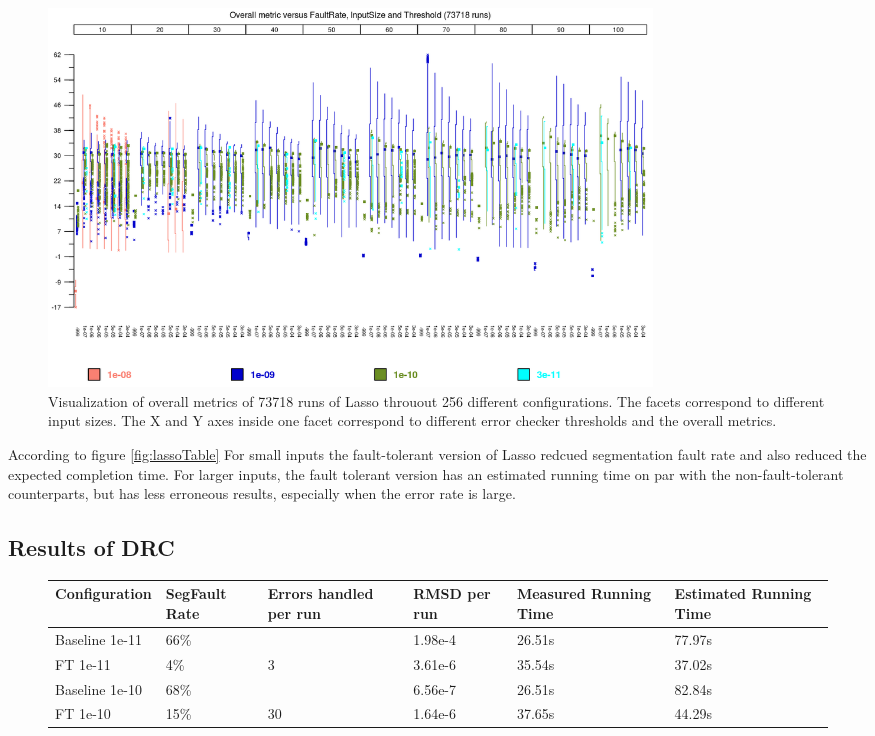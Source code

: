 \documentclass{article}
\begin{document}
\begin{figure}[h!]
\begin{center}
\includegraphics[width=16cm]{OverallMetric_Lasso_Boxplot.png}
\end{center}
\caption{Visualization of overall metrics of 73718 runs of Lasso throuout 256 different configurations. The facets correspond to different input sizes. The X and Y axes inside one facet correspond to different error checker thresholds and the overall metrics.}
\end{figure}

According to figure \ref{fig:lassoTable} For small inputs the fault-tolerant version of Lasso redcued segmentation fault rate and also reduced the expected completion time. For larger inputs, the fault tolerant version has an estimated running time on par with the non-fault-tolerant counterparts, but has less erroneous results, especially when the error rate is large.

\subsection{Results of DRC}

\begin{figure}[h!]
 \begin{center} \begin{tabular}{p{2.5cm}p{2cm}p{2cm}p{2.5cm}p{2.5cm}p{2.5cm}}

\hline
Configuration & SegFault Rate & Errors handled per run & RMSD per run & Measured Running Time & Estimated Running Time\\
\hline
Baseline 1e-11 & 66\% &         & 1.98e-4 & 26.51s & 77.97s \\
FT 1e-11       & 4\%  & 3       & 3.61e-6 & 35.54s & 37.02s \\
Baseline 1e-10 & 68\% &         & 6.56e-7 & 26.51s & 82.84s \\
FT 1e-10       & 15\% & 30      & 1.64e-6 & 37.65s & 44.29s \\
\hline
\end{tabular} 
\end{center} 

\end{figure}
\end{document}

